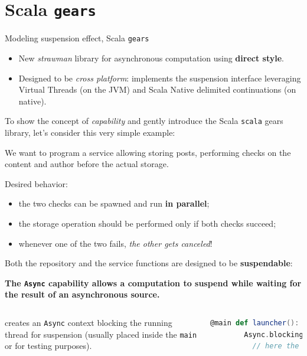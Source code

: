 \documentclass[aspectratio=1610,xcolor=dvipsnames]{beamer}
\begin{document}
\section{Scala \texttt{gears}}
\begin{frame}{Modeling suspension effect, Scala \texttt{gears} \cite{gears}}
  \begin{itemize}
    \item New \emph{strawman} library for asynchronous computation using \textbf{direct style}.
    \item Designed to be \emph{cross platform}: implements the suspension interface leveraging Virtual Threads (on the JVM) and Scala Native delimited continuations (on native).
  \end{itemize}
\end{frame}
%
\begin{frame}
  To show the concept of \textit{capability} and gently introduce the Scala \texttt{scala} gears library, let's consider this very simple example:
  \begin{example}[1]
    We want to program a service allowing storing posts, performing checks on the content and author before the actual storage.
  \end{example}
  Desired behavior:
  \begin{itemize}
    \item the two checks can be spawned and run \textbf{in parallel};
    \item the storage operation should be performed only if both checks succeed;
    \item whenever one of the two fails, \emph{the other gets canceled}!
  \end{itemize}
\end{frame}
%
\begin{frame}[fragile] %
  \small
  Both the repository and the service functions are designed to be \textbf{suspendable}:
  \begin{block}{}
    \textbf{The \texttt{Async} capability allows a computation to suspend while waiting for the result of an asynchronous source.}
  \end{block}
  
  \pause
  \begin{columns}
       creates an \texttt{Async} context blocking the running thread for suspension (usually placed inside the \texttt{main} or for testing purposes).
    \begin{lstlisting}[language=scala,gobble=6]
      @main def launcher(): Unit =
        Async.blocking:
          // here the Async capability is available
    \end{lstlisting}
  \end{columns}
\end{frame}
\end{document}
